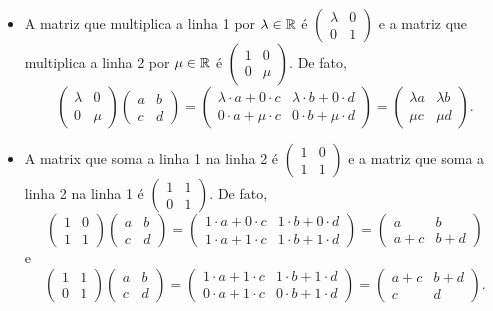 \begin{ex}
\begin{itemize}
		\item A matriz que multiplica a linha 1 por $\lambda\in \mathbb R$ é $\begin{pmatrix}
		\lambda&0\\0&1
		\end{pmatrix}$ e a matriz que multiplica a linha 2 por $\mu\in \mathbb R$ é $\begin{pmatrix}
		1&0\\0&\mu
		\end{pmatrix}$. De fato, 
		\[\begin{pmatrix}
			\lambda&0\\
			0&\mu
		\end{pmatrix}\begin{pmatrix}
		a&b\\c&d
		\end{pmatrix}=\begin{pmatrix}
		\lambda\cdot a+0\cdot c&\lambda\cdot b+0\cdot d\\
		0\cdot a+\mu\cdot c&0\cdot b+\mu\cdot d
		\end{pmatrix}=\begin{pmatrix}
		\lambda a&\lambda b\\\mu c&\mu d
		\end{pmatrix}.\]
		\item A matrix que soma a linha 1 na linha 2 é $\begin{pmatrix}
		1&0\\1&1
		\end{pmatrix}$ e a matriz que soma a linha 2 na linha 1 é $\begin{pmatrix}
		1&1\\0&1
		\end{pmatrix}$. De fato,
		\[\begin{pmatrix}
		1&0\\1&1
		\end{pmatrix}\begin{pmatrix}
		a&b\\c&d
		\end{pmatrix}=\begin{pmatrix}
		1\cdot a+0\cdot c&1\cdot b+0\cdot d\\
		1\cdot a+1\cdot c&1\cdot b+1\cdot d
		\end{pmatrix}=\begin{pmatrix}
		a & b\\
		a+c&b+d
		\end{pmatrix}\]e
		\[\begin{pmatrix}
		1&1\\0&1
		\end{pmatrix}\begin{pmatrix}
		a&b\\c&d
		\end{pmatrix}=\begin{pmatrix}
		1\cdot a+1\cdot c&1\cdot b+1\cdot d\\
		0\cdot a+1\cdot c&0\cdot b+1\cdot d
		\end{pmatrix}=\begin{pmatrix}
		a+c & b+d\\
		c&d
		\end{pmatrix}.\]
	\end{itemize}


\end{ex}
